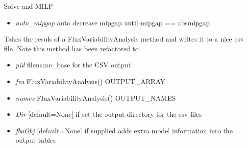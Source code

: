 \documentclass[a4paper,11pt,english]{sphinxmanual}
\begin{document}

\begin{fulllineitems}
\label{modules_doc:cbmpy.CBCPLEX.cplx_SolveMILP}
Solve and MILP
\begin{itemize}
\item {} 
\emph{auto\_mipgap} auto decrease mipgap until mipgap == absmipgap

\end{itemize}

\end{fulllineitems}


\begin{fulllineitems}
\label{modules_doc:cbmpy.CBCPLEX.cplx_WriteFVAtoCSV}
Takes the resuls of a FluxVariabilityAnalysis method and writes it to a nice
csv file. Note this method has been refactored to .
\begin{itemize}
\item {} 
\emph{pid} filename\_base for the CSV output

\item {} 
\emph{fva} FluxVariabilityAnalysis() OUTPUT\_ARRAY

\item {} 
\emph{names} FluxVariabilityAnalysis() OUTPUT\_NAMES

\item {} 
\emph{Dir} {[}default=None{]} if set the output directory for the csv files

\item {} 
\emph{fbaObj} {[}default=None{]} if supplied adds extra model information into the output tables

\end{itemize}

\end{fulllineitems}

\end{document}
